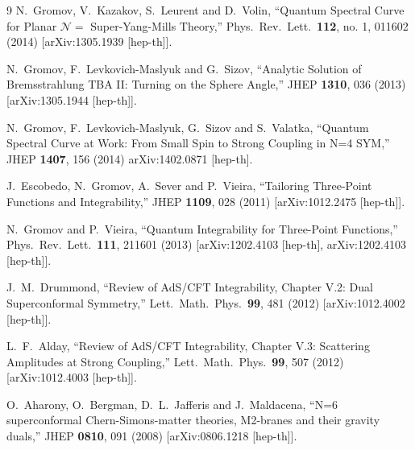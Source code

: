 \documentclass[a4paper,11pt]{article}
\numberwithin{equation}{section}
\begin{document}
\begin{thebibliography} {9}
  N.~Gromov, V.~Kazakov, S.~Leurent and D.~Volin,
  ``Quantum Spectral Curve for Planar $\mathcal{N} =$ Super-Yang-Mills Theory,''
  Phys.\ Rev.\ Lett.\  {\bf 112}, no. 1, 011602 (2014)
  [arXiv:1305.1939 [hep-th]].

  N.~Gromov, F.~Levkovich-Maslyuk and G.~Sizov,
  ``Analytic Solution of Bremsstrahlung TBA II: Turning on the Sphere Angle,''
  JHEP {\bf 1310}, 036 (2013)
  [arXiv:1305.1944 [hep-th]].

  N.~Gromov, F.~Levkovich-Maslyuk, G.~Sizov and S.~Valatka,
  ``Quantum Spectral Curve at Work: From Small Spin to Strong Coupling in N=4 SYM,''
  JHEP {\bf 1407}, 156 (2014)
  arXiv:1402.0871 [hep-th].

  J.~Escobedo, N.~Gromov, A.~Sever and P.~Vieira,
  ``Tailoring Three-Point Functions and Integrability,''
  JHEP {\bf 1109}, 028 (2011)
  [arXiv:1012.2475 [hep-th]].

  N.~Gromov and P.~Vieira,
  ``Quantum Integrability for Three-Point Functions,''
  Phys.\ Rev.\ Lett.\  {\bf 111}, 211601 (2013)
  [arXiv:1202.4103 [hep-th], arXiv:1202.4103 [hep-th]].

  J.~M.~Drummond,
  ``Review of AdS/CFT Integrability, Chapter V.2: Dual Superconformal Symmetry,''
  Lett.\ Math.\ Phys.\  {\bf 99}, 481 (2012)
  [arXiv:1012.4002 [hep-th]].

  L.~F.~Alday,
  ``Review of AdS/CFT Integrability, Chapter V.3: Scattering Amplitudes at Strong Coupling,''
  Lett.\ Math.\ Phys.\  {\bf 99}, 507 (2012)
  [arXiv:1012.4003 [hep-th]].

  O.~Aharony, O.~Bergman, D.~L.~Jafferis and J.~Maldacena,
  ``N=6 superconformal Chern-Simons-matter theories, M2-branes and their gravity duals,''
  JHEP {\bf 0810}, 091 (2008)
  [arXiv:0806.1218 [hep-th]].


\end{thebibliography}
\end{document}
